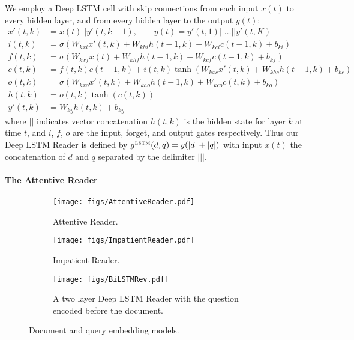 \documentclass{article}
\newcommand{\igate}{i}
\newcommand{\fgate}{f}
\newcommand{\wtmat}[2]{W_{#1 #2}}
\newcommand{\ogate}{o}
\newcommand{\state}{c}
\begin{document}
We employ a Deep LSTM cell with skip connections from each input $x(t)$ to every
hidden layer, and from every hidden layer to the output $y(t)$:
\begin{align*}
  x'(t,k) &= x(t)||y'(t,k-1), \quad\quad y(t) = y'(t,1) || \ldots || y'(t,K) \\
  \igate(t,k) &= \sigma\left(\wtmat{kx}{\igate} x'(t,k) + \wtmat{kh}{\igate} h(t-1,k) + \wtmat{k\state}{\igate} \state(t-1,k)  + b_{k\igate}\right)\\
  \fgate(t,k) &= \sigma\left(\wtmat{kx}{\fgate} x(t) + \wtmat{kh}{\fgate} h(t-1,k) + \wtmat{k\state}{\fgate} \state(t-1,k) + b_{k\fgate} \right)\\
  \state(t,k) &= \fgate(t,k) \state(t-1,k) + \igate(t,k) \tanh \left(\wtmat{kx}{\state} x'(t,k) + \wtmat{kh}{\state} h(t-1,k) + b_{k\state} \right) \\
  \ogate(t,k) &= \sigma\left(\wtmat{kx}{\ogate} x'(t,k) + \wtmat{kh}{\ogate} h(t-1,k) + \wtmat{k\state}{\ogate} \state(t,k) + b_{k\ogate}\right)\\
  h(t,k) &= \ogate(t,k) \tanh\left(\state(t,k)\right)\\
  y'(t,k) &= \wtmat{k}{y}h(t,k) + b_{ky}
\end{align*}
where $||$ indicates vector concatenation $h(t,k)$ is the hidden state for layer
$k$ at time $t$, and $\igate$, $\fgate$, $\ogate$ are the input, forget, and
output gates respectively.
Thus our Deep LSTM Reader is defined by $g^{\text{\tiny LSTM}}(d,q) = y(|d|+|q|)$ with input $x(t)$ the concatenation of $d$ and $q$ separated by the delimiter $|||$.

\paragraph{The Attentive Reader}

\newcommand{\attnIn}{m}
\newcommand{\attnU}{u}
\newcommand{\attnOver}{y}
\newcommand{\attnMix}{r}
\newcommand{\attnMid}{z}
\newcommand{\attnScore}{s}
\newcommand{\fwd}[1]{\overrightarrow{#1}}
\newcommand{\back}[1]{\overleftarrow{#1}}
\newcommand{\softmax}[2]{\frac{\exp\left(#1\right)}{#2}}

\begin{figure}
\centering
  \begin{subfigure}[b]{0.49\textwidth}
    \centering
    \texttt{[image: figs/AttentiveReader.pdf]}
    \caption{Attentive Reader.}
  \end{subfigure}
  \begin{subfigure}[b]{0.49\textwidth}
    \centering
    \texttt{[image: figs/ImpatientReader.pdf]}
    \caption{Impatient Reader.}
  \end{subfigure}
  \begin{subfigure}[b]{1.0\textwidth}
    \centering
\texttt{[image: figs/BiLSTMRev.pdf]}
    \caption{A two layer Deep LSTM Reader with the question encoded before
             the document.}
  \end{subfigure}
  \caption{Document and query embedding models.}
\label{fig:models}
\end{figure}
\end{document}
